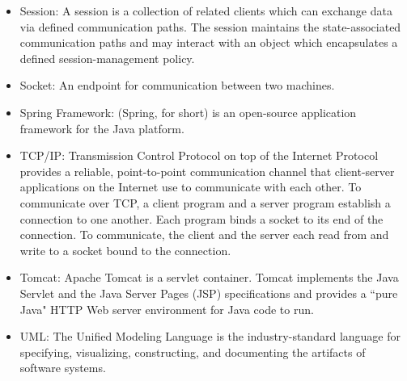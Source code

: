 \begin{itemize}
    \item Session: A session is a collection of related clients which can exchange data via defined communication paths. The session maintains the state-associated communication paths and may interact with an object which encapsulates a defined session-management policy.
    \item Socket: An endpoint for communication between two machines.
    \item Spring Framework\label{def:spring}: (Spring, for short) is an open-source application framework for the Java platform.
    \item TCP/IP: Transmission Control Protocol on top of the Internet Protocol provides a reliable, point-to-point communication channel that client-server applications on the Internet use to communicate with each other. To communicate over TCP, a client program and a server program establish a connection to one another. Each program binds a socket to its end of the connection. To communicate, the client and the server each read from and write to a socket bound to the connection.
    \item Tomcat: Apache Tomcat is a servlet container. Tomcat implements the Java Servlet and the Java Server Pages (JSP) specifications and provides a ``pure Java" HTTP Web server environment for Java code to run.
    \item UML: The Unified Modeling Language is the industry-standard language for specifying, visualizing, constructing, and documenting the artifacts of software systems.
\end{itemize}
